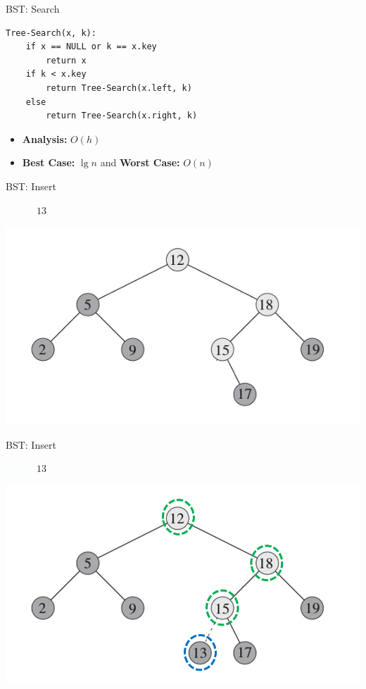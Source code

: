 \documentclass{beamer}
\newcommand{\tblue}[1]{{\Large {\textcolor{azure}{#1}}}}
\begin{document}
\begin{frame}[fragile]{BST: Search}
    \begin{verbatim}
Tree-Search(x, k):
    if x == NULL or k == x.key
        return x
    if k < x.key
        return Tree-Search(x.left, k)
    else
        return Tree-Search(x.right, k)
    \end{verbatim}
    \begin{itemize}
        \item {\bf Analysis:} \pause $O(h)$
        \item {\bf Best Case:} $\lg n$ and {\bf Worst Case:} $O(n)$
    \end{itemize}
\end{frame}


\begin{frame}{BST: Insert}

\tblue{Insert:} $13$
    \begin{center}
        \includegraphics[scale=0.5]{bstInsert.png}
    \end{center}
\end{frame}


\begin{frame}{BST: Insert}

\tblue{Insert:} $13$
    \begin{center}
        \includegraphics[scale=0.5]{bstInsert2.png}
    \end{center}
\end{frame}
\end{document}
